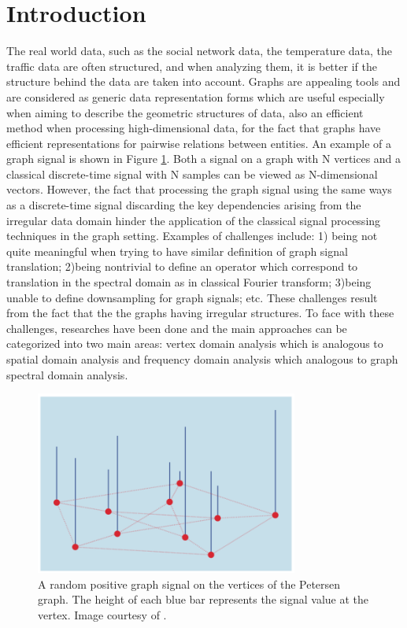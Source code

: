 \documentclass[conference]{IEEEtran}
\begin{document}
\section{Introduction}
The real world data, such as the social network data, the temperature data, the traffic data are often structured, and when analyzing them, it is better if the structure behind the data are taken into account. Graphs are appealing tools and are considered as generic data representation forms which are useful especially when aiming to describe the geometric structures of data, also an efficient method when processing high-dimensional data, for the fact that graphs have efficient representations for pairwise relations between entities. An example of a graph signal is shown in Figure \ref{1}. Both a signal on a graph with N vertices and a classical discrete-time signal with N samples can be viewed as N-dimensional vectors\cite{b1}. However, the fact that processing the graph signal using the same ways as a discrete-time signal discarding the key dependencies arising from the irregular data domain hinder the application of the classical signal processing techniques in the graph setting. Examples of challenges include: 1) being not quite meaningful when trying to have similar definition of graph signal translation; 2)being nontrivial to define an operator which correspond to translation in the spectral domain as in classical Fourier transform; 3)being unable to define downsampling for graph signals; etc. These challenges result from the fact that the the graphs having  irregular structures. To face with these challenges, researches have been done and the main approaches can be categorized into two main areas: vertex domain analysis which is analogous to spatial domain analysis and frequency domain analysis which analogous to graph spectral domain analysis. 
\begin{figure}[!htbp]
\centerline{\includegraphics[width=3.4in]{1.png}}
\caption{A random positive graph signal on the vertices of the Petersen graph. The height of each blue bar represents the signal value at the vertex. Image courtesy of \cite{b1}.}
\label{1}
\end{figure}
\end{document}
